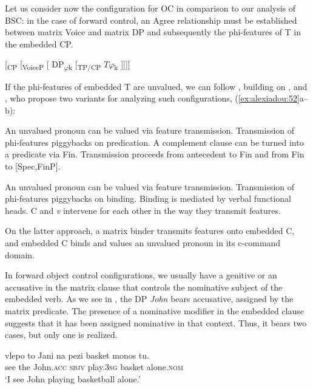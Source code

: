 \documentclass[output=paper]{langsci/langscibook}
\begin{document}
Let us consider now the configuration for OC in comparison to our analysis of BSC: in the case of forward control, an Agree relationship must be established between matrix Voice and matrix DP and subsequently the phi-features of T in the embedded CP.    

\ea%
    \label{ex:alexiadou:51}
    [\textsubscript{CP} [\textsubscript{VoiceP} [ DP\textsubscript{$\varphi $}\textsubscript{k} [\textsubscript{TP/CP}    $T\varphi $\textsubscript{k}    ]]]]
    \z

If the phi-features of embedded T are unvalued, we can follow \citet{Grano2016}, building on \citet{Kratzer2009}, and \citet{Landau2015}, who propose two variants for analyzing such configurations, (\ref{ex:alexiadou:52}a--b):


\ea%
    \label{ex:alexiadou:52}
    \ea
    \begin{xlisti}
    \ex An unvalued pronoun can be valued via feature transmission.
    \ex Transmission of phi-features piggybacks on predication.
    \ex A complement clause can be turned into a predicate via Fin.
    \ex Transmission proceeds from antecedent to Fin and from Fin to [Spec,FinP].
    \end{xlisti}
    \ex
    \begin{xlisti}
    \ex An unvalued pronoun can be valued via feature transmission.
    \ex Transmission of phi-features piggybacks on binding.
    \ex Binding is mediated by verbal functional heads.
    \ex C and \textit{v} intervene for each other in the way they transmit features.
    \end{xlisti}
    \z
\z

On the latter approach, a matrix binder transmits features onto embedded C, and embedded C binds and values an unvalued pronoun in its c-command domain.

In forward object control configurations, we usually have a genitive or an accusative in the matrix clause that controls the nominative subject of the embedded verb. As we see in , the DP \textit{John} bears accusative, assigned by the matrix predicate. The presence of a nominative modifier in the embedded clause suggests that it has been assigned nominative in that context. Thus, it bears two cases, but only one is realized.

\ea%
    \label{ex:alexiadou:53}
    \gll vlepo to    Jani        na   pezi        basket  {monos tu}.\\
         see     the John.\textsc{acc} \textsc{sbjv} play.\textsc{3sg} basket  alone.\textsc{nom}\\
    \glt ‘I see John playing basketball alone.’
    \z
\end{document}

